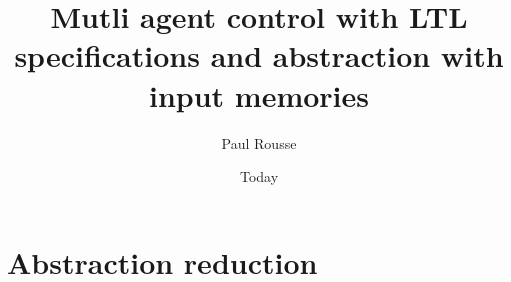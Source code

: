\documentclass[electronic]{kthesis}
\newcommand{\vect}[1]{\ensuremath{ \mathbf{#1}}}
\theoremstyle{named}
\begin{document}
\title{Mutli agent control with LTL specifications and abstraction with input memories}
\subtitle{}
\author{Paul Rousse}
\date{Today}
\imprint{}
\disputationsdatum{}
\disputationslokal{}
\publisher{}
\examen{}

\frontmatter

\maketitle

\mainmatter 

\newcommand{\SSunobs}{\mathfrak{X}^i}
\newcommand{\SSobs}{\mathfrak{X}^o}
\newcommand{\Ninputs}{\Delta n_u}%
\newcommand{\y}{\vect{y}}%
\newcommand{\x}{\vect{x}}%
\newcommand{\xa}{\vect{x}^a}%
\newcommand{\xobs}{\vect{x}^o}%
\newcommand{\Xobs}{X^o}%
\newcommand{\Xobsinit}{X^o_0}%
\newcommand{\xunobs}{\vect{x}^i}%
\newcommand{\Xunobs}{X^i}%
\newcommand{\Sunobs}{\mathcal{S}^i}%
\newcommand{\Xuinv}{{\mathcal{X}^i}}%
\newcommand{\pastuseq}{\vect{u}_{n-\Ninputs},\dots,\vect{u}_{n-1}}%
\newcommand{\pastuseqn}{\vect{u}_{n+1-\Ninputs},\dots,\vect{u}_{n}}%
\newcommand{\Pastuseq}{U_n}%
\newcommand{\sys}{\mathcal{S}}%
\newcommand{\sysa}{\mathcal{S}_a}%
\newcommand{\sysaU}{\mathcal{U}}%
\newcommand{\sysA}{\mathcal{S}_A}%
\newcommand{\sysB}{\mathcal{S}_B}%
\newcommand{\Usys}{\mathcal{U}}%
\newcommand{\Wsys}{\mathcal{W}}%
\newcommand{\Uunobs}{{\mathcal{U}^i}}%
\newcommand{\Wunobs}{{\mathcal{W}^i}}%
\newcommand{\uobs}{\vect{u}^o}%
\newcommand{\wobs}{\vect{w}^o}%
\newcommand{\uunobs}{\vect{u}^i}%
\newcommand{\wunobs}{\vect{w}^i}%
\newcommand{\Dunobs}{n^i}%
\newcommand{\R}{\mathbb{R}}%
\newcommand{\mle}{\prec}
\newcommand{\mleq}{\preceq}
\newcommand{\minf}[1]{\underline{#1}}
\newcommand{\msup}[1]{\overline{#1}}
\newcommand{\X}{X}%
\newcommand{\Xinv}{\mathcal{X}}%
\newcommand{\U}{\mathcal{U}}%
\newcommand{\W}{\mathcal{W}}%
\newcommand{\vu}{\vect{u}}%
\renewcommand{\u}{\vect{u}}%
\renewcommand{\U}{\mathcal{U}}%
\newcommand{\w}{\vect{w}}%
\newcommand{\s}{\vect{s}}%
\newcommand{\st}{\vect{t}}%
%
\newcommand{\traj}{\varphi}
%
\newcommand{\xd}{\x_d}
\newcommand{\vd}{\vect{v}_d}
\newcommand{\Nobs}{N^o} %
%


\chapter{Abstraction reduction}




%
\end{document}
